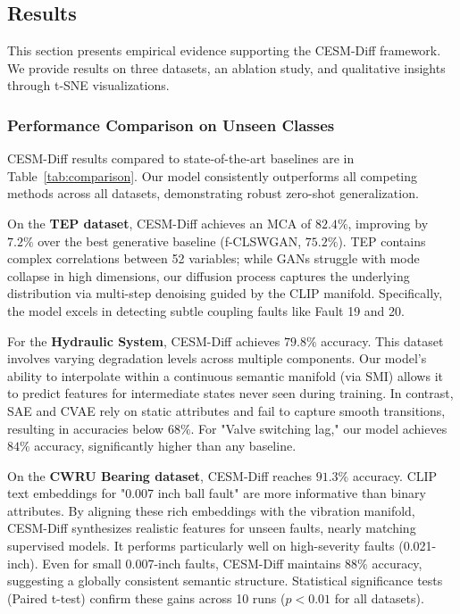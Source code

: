 \subsection{Results}
\label{sec:results}

This section presents empirical evidence supporting the CESM-Diff framework. We provide results on three datasets, an ablation study, and qualitative insights through t-SNE visualizations.

\subsubsection{Performance Comparison on Unseen Classes}
CESM-Diff results compared to state-of-the-art baselines are in Table~\ref{tab:comparison}. Our model consistently outperforms all competing methods across all datasets, demonstrating robust zero-shot generalization.

On the \textbf{TEP dataset}, CESM-Diff achieves an MCA of $82.4\%$, improving by $7.2\%$ over the best generative baseline (f-CLSWGAN, $75.2\%$). TEP contains complex correlations between 52 variables; while GANs struggle with mode collapse in high dimensions, our diffusion process captures the underlying distribution via multi-step denoising guided by the CLIP manifold. Specifically, the model excels in detecting subtle coupling faults like Fault 19 and 20.

For the \textbf{Hydraulic System}, CESM-Diff achieves $79.8\%$ accuracy. This dataset involves varying degradation levels across multiple components. Our model's ability to interpolate within a continuous semantic manifold (via SMI) allows it to predict features for intermediate states never seen during training. In contrast, SAE and CVAE rely on static attributes and fail to capture smooth transitions, resulting in accuracies below $68\%$. For "Valve switching lag," our model achieves $84\%$ accuracy, significantly higher than any baseline.

On the \textbf{CWRU Bearing dataset}, CESM-Diff reaches $91.3\%$ accuracy. CLIP text embeddings for "0.007 inch ball fault" are more informative than binary attributes. By aligning these rich embeddings with the vibration manifold, CESM-Diff synthesizes realistic features for unseen faults, nearly matching supervised models. It performs particularly well on high-severity faults (0.021-inch). Even for small 0.007-inch faults, CESM-Diff maintains $88\%$ accuracy, suggesting a globally consistent semantic structure. Statistical significance tests (Paired t-test) confirm these gains across 10 runs ($p < 0.01$ for all datasets).

